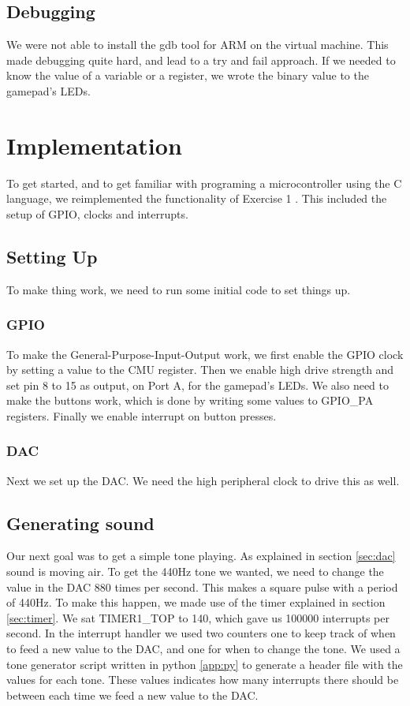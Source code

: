 \subsection{Debugging}
We were not able to install the gdb tool for ARM on the virtual machine. This made debugging quite hard, and lead to a try and fail approach. If we needed to know the value of a variable or a register, we wrote the binary value to the gamepad's LEDs.

\section{Implementation}
To get started, and to get familiar with programing a microcontroller using the C language, we reimplemented the functionality of Exercise 1 \cite{ex1}. This included the setup of GPIO, clocks and interrupts.

\subsection{Setting Up}
To make thing work, we need to run some initial code to set things up. 
\subsubsection{GPIO}
To make the General-Purpose-Input-Output work, we first enable the GPIO clock by setting a value to the CMU register.
Then we enable high drive strength and set pin 8 to 15 as output, on Port A, for the gamepad's LEDs. We also need to make the buttons work, which is done by writing some values to GPIO\_PA registers.
Finally we enable interrupt on button presses.

\subsubsection{DAC}
Next we set up the DAC. We need the high peripheral clock to drive this as well. 

\subsection{Generating sound}
\label{sec:generating}
Our next goal was to get a simple tone playing. As explained in section \ref{sec:dac} sound is moving air. To get the 440Hz tone we wanted, we need to change the value in the DAC 880 times per second. This makes a square pulse with a period of 440Hz.
To make this happen, we made use of the timer explained in section
\ref{sec:timer}. We sat TIMER1\_TOP to 140, which gave us 100000 interrupts per second.
In the interrupt handler we used two counters one to keep track of when to feed a new value to the DAC, and one for when to change the tone.
We used a tone generator script written in python \ref{app:py} to generate a header file with the values for each tone. These values indicates how many interrupts there should be between each time we feed a new value to the DAC.

